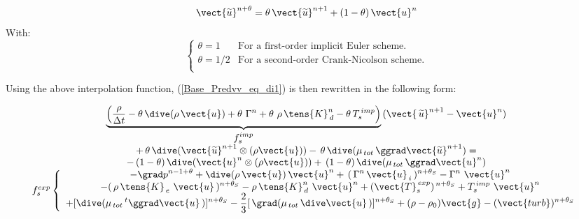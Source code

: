 \begin{equation}
\vect {\widetilde{u}}^{n+\theta}=\theta\, \vect
{\widetilde{u}}^{n+1}+(1-\theta)\, \vect {u}^{n}\\
\end{equation}
With:
\begin{equation}
\left\{
\begin{array}{ll}
\theta = 1   & \text{For a first-order implicit Euler scheme.}\\
\theta = 1/2 & \text{For a second-order Crank-Nicolson scheme.}\\
\end{array}
\right.
\end{equation}

Using the above interpolation function, (\ref{Base_Predvv_eq_di1}) is then rewritten in the following form:

\begin{equation}\label{Base_Predvv_eq_di2}
\begin{array}{c}
\displaystyle \underbrace{\left(\frac{\rho}{\Delta t} -\theta \,\dive (\rho\,\vect {u}) +\theta \,\, \Gamma^n +
\theta \,\, \rho\,\tens{K}_{\,d}^n-\theta \,T_s^{\,imp} \right)}_{\displaystyle f_s^{imp}}\, (\vect {\,\widetilde{u}}^{n+1} -\vect {u}^{n})
\\
 +\, \theta\, \dive(\vect {\widetilde{u}}^{n+1} \otimes (\rho\vect{u}))-\, \theta\,\dive (\mu_{\,tot}\,\ggrad \vect {\widetilde{u}}^{n+1}) =
\\
-\,(1-\theta)\, \dive(\vect {u}^{n} \otimes (\rho\vect{u})) +\,(1-\theta)\,\dive (\mu_{\,tot}\,\ggrad \vect {u}^{n})
\\
f_s^{exp}\left\{
\begin{array}{c}
\displaystyle
- \grad p^{n-1+\theta} + \dive (\rho\,\vect {u})\,\vect{u}^{n} +\,(\,\Gamma^{n}\,\vect{u}_{\,i}\,)^{n+\theta_S}- \Gamma^n\,\,\vect{u}^{n}
\\
\displaystyle
-(\,\rho\,\tens{K}_{\,e}\ \vect{u}\,)^{n+\theta_S} -\rho\,\tens{K}_{\,d}^n\ \vect{u}^{n}+ (\vect{T}_{s}^{\,exp})^{\,n+\theta_S} + T_s^{\,imp}\,\,\vect {u}^{n}
\\
\displaystyle
+[\dive (\mu_{\,tot}\,^t\ggrad \vect {u}\,)]^{n+\theta_S}-\frac {2} {3}[\,\grad (\mu_{\,tot}\,\dive \vect {u}\,)]^{n+\theta_S} + (\rho -\rho_0) \vect {g}-(\vect{turb})^{n+\theta_S}
\end{array}
\right.
\end{array}
\end{equation}


